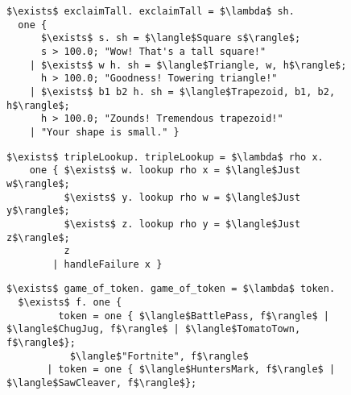 \documentclass[manuscript,screen,review, 12pt, nonacm]{acmart}
\begin{document}
    \begin{figure}[ht] 
        \begin{minipage}[h]{0.54\linewidth}
          \verselst
          \begin{lstlisting}[numbers=none, basicstyle=\tiny, xleftmargin=.2em,
                            showstringspaces=false,
                            frame=single]
$\exists$ exclaimTall. exclaimTall = $\lambda$ sh. 
  one { 
      $\exists$ s. sh = $\langle$Square s$\rangle$; 
      s > 100.0; "Wow! That's a tall square!"
    | $\exists$ w h. sh = $\langle$Triangle, w, h$\rangle$; 
      h > 100.0; "Goodness! Towering triangle!"
    | $\exists$ b1 b2 h. sh = $\langle$Trapezoid, b1, b2, h$\rangle$;
      h > 100.0; "Zounds! Tremendous trapezoid!"
    | "Your shape is small." }
            \end{lstlisting}
            \label{fig:verseexclaimtall} 
        \end{minipage}%
        \begin{minipage}[h]{0.5\linewidth}
          \verselst
          \begin{lstlisting}[numbers=none, basicstyle=\tiny, xleftmargin=2em,
                        frame=single]
$\exists$ tripleLookup. tripleLookup = $\lambda$ rho x. 
    one { $\exists$ w. lookup rho x = $\langle$Just w$\rangle$; 
          $\exists$ y. lookup rho w = $\langle$Just y$\rangle$; 
          $\exists$ z. lookup rho y = $\langle$Just z$\rangle$;
          z
        | handleFailure x }
          \end{lstlisting}
            \label{fig:versetriplelookup} 
        \vspace{4ex}
        \end{minipage} 
        \begin{minipage}[h]{\linewidth}
          \verselst
          \begin{lstlisting}[numbers=none, basicstyle=\tiny, xleftmargin=9em, 
                            frame=single, showstringspaces=false]
$\exists$ game_of_token. game_of_token = $\lambda$ token. 
  $\exists$ f. one {
         token = one { $\langle$BattlePass, f$\rangle$ | $\langle$ChugJug, f$\rangle$ | $\langle$TomatoTown, f$\rangle$}; 
           $\langle$"Fortnite", f$\rangle$
       | token = one { $\langle$HuntersMark, f$\rangle$ | $\langle$SawCleaver, f$\rangle$}; 

\end{lstlisting}
\end{minipage}
\end{figure}
\end{document}
